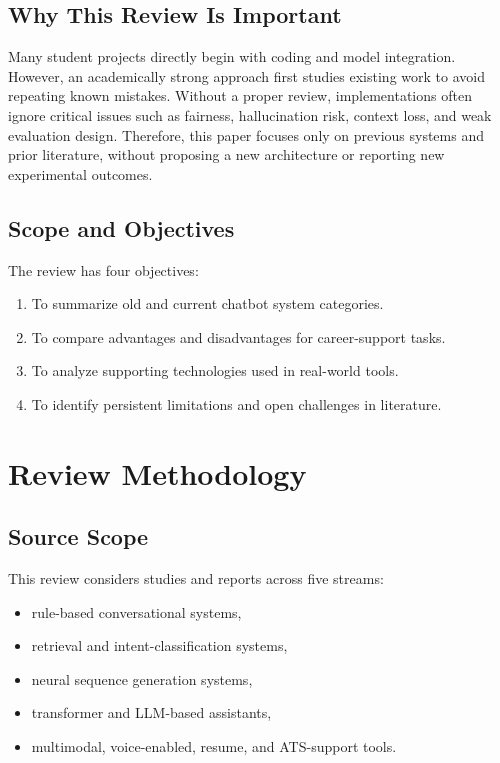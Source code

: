 \documentclass[conference]{IEEEtran}
\begin{document}
\subsection{Why This Review Is Important}
Many student projects directly begin with coding and model integration. However, an academically strong approach first studies existing work to avoid repeating known mistakes. Without a proper review, implementations often ignore critical issues such as fairness, hallucination risk, context loss, and weak evaluation design. Therefore, this paper focuses only on previous systems and prior literature, without proposing a new architecture or reporting new experimental outcomes.

\subsection{Scope and Objectives}
The review has four objectives:
\begin{enumerate}
    \item To summarize old and current chatbot system categories.
    \item To compare advantages and disadvantages for career-support tasks.
    \item To analyze supporting technologies used in real-world tools.
    \item To identify persistent limitations and open challenges in literature.
\end{enumerate}

\section{Review Methodology}
\subsection{Source Scope}
This review considers studies and reports across five streams:
\begin{itemize}
    \item rule-based conversational systems,
    \item retrieval and intent-classification systems,
    \item neural sequence generation systems,
    \item transformer and LLM-based assistants,
    \item multimodal, voice-enabled, resume, and ATS-support tools.
\end{itemize}
\end{document}
